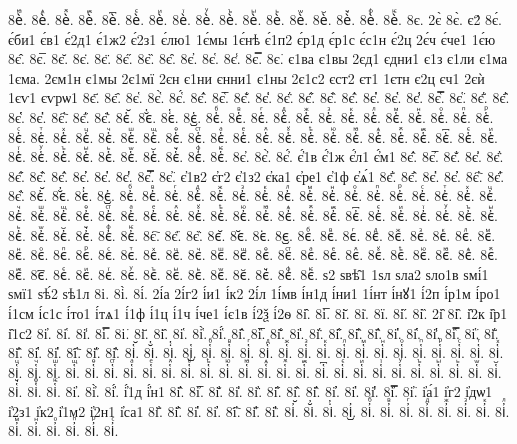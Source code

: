 {8ѐⷼ.
8ѐⷽ.
8ѐⷾ.
8ѐⷿ.
8ѐ꙯.
8ѐꙴ.
8ѐꙵ.
8ѐꙶ.
8ѐꙷ.
8ѐꙸ.
8ѐꙹ.
8ѐꙺ.
8ѐꙻ.
8ѐ꙼.
8ѐ꙽.
8ѐꚞ.
8ѐꚟ.
8є.
2є̀
8є̀.
є2́
8є́.
є́би1
є́в1
є́2д1
є́1ж2
є́2з1
є́лю1
1є́мы
1є́нѣ
є́1п2
є́р1д
є́р1с
є́с1н
є́2ц
2є́ч
є́че1
1є́ю
8є̂.
8є̅.
8є̆.
8є̇.
8є̈.
8є̋.
8є̏.
8є̑.
8є̓.
8є̔.
8є̾.
8є̿.
8є͘.
є1ва
є1вы
2єд1
єдни1
є1з
є1ли
є1ма
1єма.
2єм1н
є1мы
2є1мї
2єн
є1ни
єнни1
є1ны
2є1с2
єст2
єт1
1єтн
є2ц
єч1
2єѝ
1єѵ1
єѵрѡ1
8є҃.
8є҄.
8є҅.
8є҅̀.
8є҅́.
8є҅̂.
8є҅̅.
8є҅̆.
8є҅̇.
8є҅̈.
8є҅̋.
8є҅̏.
8є҅̑.
8є҅̓.
8є҅̔.
8є҅̾.
8є҅̿.
8є҅͘.
8є҅҃.
8є҅҄.
8є҅҅.
8є҅҆.
8є҅҇.
8є҅᷀.
8є҅᷁.
8є҅᷶.
8є᷷҅.
8є᷸҅.
8є᷹҅.
8є҅ⷠ.
8є҅ⷡ.
8є҅ⷢ.
8є҅ⷣ.
8є҅ⷤ.
8є҅ⷥ.
8є҅ⷦ.
8є҅ⷧ.
8є҅ⷨ.
8є҅ⷩ.
8є҅ⷪ.
8є҅ⷫ.
8є҅ⷬ.
8є҅ⷭ.
8є҅ⷮ.
8є҅ⷯ.
8є҅ⷰ.
8є҅ⷱ.
8є҅ⷲ.
8є҅ⷳ.
8є҅ⷴ.
8є҅ⷵ.
8є҅ⷶ.
8є҅ⷷ.
8є҅ⷸ.
8є҅ⷹ.
8є҅ⷺ.
8є҅ⷻ.
8є҅ⷼ.
8є҅ⷽ.
8є҅ⷾ.
8є҅ⷿ.
8є҅꙯.
8є҅ꙴ.
8є҅ꙵ.
8є҅ꙶ.
8є҅ꙷ.
8є҅ꙸ.
8є҅ꙹ.
8є҅ꙺ.
8є҅ꙻ.
8є҅꙼.
8є҅꙽.
8є҅ꚞ.
8є҅ꚟ.
8є҆.
8є҆̀.
8є҆́.
є҆́1в
є҆́1ж
є҆́л1
є҆́м1
8є҆̂.
8є҆̅.
8є҆̆.
8є҆̇.
8є҆̈.
8є҆̋.
8є҆̏.
8є҆̑.
8є҆̓.
8є҆̔.
8є҆̾.
8є҆̿.
8є҆͘.
є҆1в2
є҆г2
є҆1з2
є҆ка1
є҆ре1
є҆1ф
є҆ѧ́1
8є҆҃.
8є҆҄.
8є҆҅.
8є҆҆.
8є҆҇.
8є҆᷀.
8є҆᷁.
8є҆᷶.
8є᷷҆.
8є᷸҆.
8є᷹҆.
8є҆ⷠ.
8є҆ⷡ.
8є҆ⷢ.
8є҆ⷣ.
8є҆ⷤ.
8є҆ⷥ.
8є҆ⷦ.
8є҆ⷧ.
8є҆ⷨ.
8є҆ⷩ.
8є҆ⷪ.
8є҆ⷫ.
8є҆ⷬ.
8є҆ⷭ.
8є҆ⷮ.
8є҆ⷯ.
8є҆ⷰ.
8є҆ⷱ.
8є҆ⷲ.
8є҆ⷳ.
8є҆ⷴ.
8є҆ⷵ.
8є҆ⷶ.
8є҆ⷷ.
8є҆ⷸ.
8є҆ⷹ.
8є҆ⷺ.
8є҆ⷻ.
8є҆ⷼ.
8є҆ⷽ.
8є҆ⷾ.
8є҆ⷿ.
8є҆꙯.
8є҆ꙴ.
8є҆ꙵ.
8є҆ꙶ.
8є҆ꙷ.
8є҆ꙸ.
8є҆ꙹ.
8є҆ꙺ.
8є҆ꙻ.
8є҆꙼.
8є҆꙽.
8є҆ꚞ.
8є҆ꚟ.
8є҇.
8є᷀.
8є᷁.
8є᷶.
8є᷷.
8є᷸.
8є᷹.
8єⷠ.
8єⷡ.
8єⷢ.
8єⷣ.
8єⷤ.
8єⷥ.
8єⷦ.
8єⷧ.
8єⷨ.
8єⷩ.
8єⷪ.
8єⷫ.
8єⷬ.
8єⷭ.
8єⷮ.
8єⷯ.
8єⷰ.
8єⷱ.
8єⷲ.
8єⷳ.
8єⷴ.
8єⷵ.
8єⷶ.
8єⷷ.
8єⷸ.
8єⷹ.
8єⷺ.
8єⷻ.
8єⷼ.
8єⷽ.
8єⷾ.
8єⷿ.
8є꙯.
8єꙴ.
8єꙵ.
8єꙶ.
8єꙷ.
8єꙸ.
8єꙹ.
8єꙺ.
8єꙻ.
8є꙼.
8є꙽.
8єꚞ.
8єꚟ.
ѕ2
ѕвѣ̑1
1ѕл
ѕла2
ѕло1в
ѕмі́1
ѕмї1
ѕѣ́2
ѕѣ1л
8і.
8і̀.
8і́.
2і́а
2і́г2
і́и1
і́к2
2і́л
1і́мв
і́н1д
і́ни1
1і́нт
і́нꙋ1
і́2п
і́р1м
і́ро1
і́1см
і́с1с
і́то1
і́тѧ1
і́1ф
і́1ц
і́1ч
і́че1
і́є1в
і́2ѯ
і́2ѳ
8і̂.
8і̅.
8і̆.
8і̇.
8ї.
8і̋.
8і̏.
2і̑
8і̑.
і̑2к
і̑р1
і̑1с2
8і̓.
8і̔.
8і̾.
8і̿.
8і͘.
8і҃.
8і҄.
8і҅.
8і҅̀.
8і҅́.
8і҅̂.
8і҅̅.
8і҅̆.
8і҅̇.
8і҅̈.
8і҅̋.
8і҅̏.
8і҅̑.
8і҅̓.
8і҅̔.
8і҅̾.
8і҅̿.
8і҅͘.
8і҅҃.
8і҅҄.
8і҅҅.
8і҅҆.
8і҅҇.
8і҅᷀.
8і҅᷁.
8і҅᷶.
8і᷷҅.
8і᷸҅.
8і᷹҅.
8і҅ⷠ.
8і҅ⷡ.
8і҅ⷢ.
8і҅ⷣ.
8і҅ⷤ.
8і҅ⷥ.
8і҅ⷦ.
8і҅ⷧ.
8і҅ⷨ.
8і҅ⷩ.
8і҅ⷪ.
8і҅ⷫ.
8і҅ⷬ.
8і҅ⷭ.
8і҅ⷮ.
8і҅ⷯ.
8і҅ⷰ.
8і҅ⷱ.
8і҅ⷲ.
8і҅ⷳ.
8і҅ⷴ.
8і҅ⷵ.
8і҅ⷶ.
8і҅ⷷ.
8і҅ⷸ.
8і҅ⷹ.
8і҅ⷺ.
8і҅ⷻ.
8і҅ⷼ.
8і҅ⷽ.
8і҅ⷾ.
8і҅ⷿ.
8і҅꙯.
8і҅ꙴ.
8і҅ꙵ.
8і҅ꙶ.
8і҅ꙷ.
8і҅ꙸ.
8і҅ꙹ.
8і҅ꙺ.
8і҅ꙻ.
8і҅꙼.
8і҅꙽.
8і҅ꚞ.
8і҅ꚟ.
8і҆.
8і҆̀.
8і҆́.
і҆́1д
і҆́н1
8і҆̂.
8і҆̅.
8і҆̆.
8і҆̇.
8і҆̈.
8і҆̋.
8і҆̏.
8і҆̑.
8і҆̓.
8і҆̔.
8і҆̾.
8і҆̿.
8і҆͘.
і҆а́1
і҆г2
і҆дѡ1
і҆2з1
і҆к2
і҆1м2
і҆2н1
і҆са1
8і҆҃.
8і҆҄.
8і҆҅.
8і҆҆.
8і҆҇.
8і҆᷀.
8і҆᷁.
8і҆᷶.
8і᷷҆.
8і᷸҆.
8і᷹҆.
8і҆ⷠ.
8і҆ⷡ.
8і҆ⷢ.
8і҆ⷣ.
8і҆ⷤ.
8і҆ⷥ.
8і҆ⷦ.
8і҆ⷧ.
8і҆ⷨ.
8і҆ⷩ.
8і҆ⷪ.
8і҆ⷫ.
8і҆ⷬ.
8і҆ⷭ.
}
